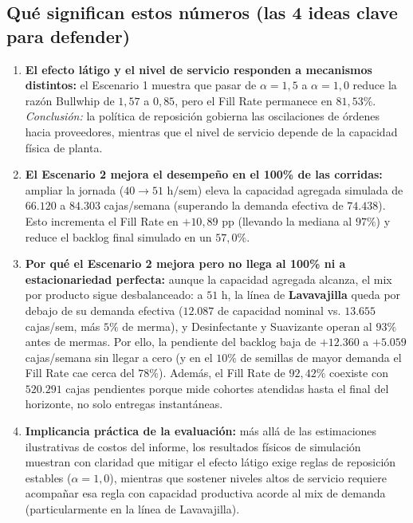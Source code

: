 \documentclass[11pt, a4paper]{article}
\begin{document}
\subsection{Qué significan estos números (las 4 ideas clave para defender)}
\begin{enumerate}[leftmargin=0.5cm, itemsep=3pt]
    \item \textbf{El efecto látigo y el nivel de servicio responden a mecanismos distintos:}
    el Escenario 1 muestra que pasar de $\alpha = 1,5$ a $\alpha = 1,0$ reduce la razón Bullwhip de $1,57$ a $0,85$, pero el Fill Rate permanece en $81,53\%$. \textit{Conclusión:} la política de reposición gobierna las oscilaciones de órdenes hacia proveedores, mientras que el nivel de servicio depende de la capacidad física de planta.

    \item \textbf{El Escenario 2 mejora el desempeño en el 100\% de las corridas:}
    ampliar la jornada ($40 \to 51\text{ h/sem}$) eleva la capacidad agregada simulada de $66.120$ a $84.303$ cajas/semana (superando la demanda efectiva de $74.438$). Esto incrementa el Fill Rate en $+10,89\text{ pp}$ (llevando la mediana al $97\%$) y reduce el backlog final simulado en un $57,0\%$.

    \item \textbf{Por qué el Escenario 2 mejora pero no llega al 100\% ni a estacionariedad perfecta:}
    aunque la capacidad agregada alcanza, el mix por producto sigue desbalanceado: a $51$ h, la línea de \textbf{Lavavajilla} queda por debajo de su demanda efectiva ($12.087$ de capacidad nominal vs. $13.655$ cajas/sem, más $5\%$ de merma), y Desinfectante y Suavizante operan al $93\%$ antes de mermas. Por ello, la pendiente del backlog baja de $+12.360$ a $+5.059$ cajas/semana sin llegar a cero (y en el $10\%$ de semillas de mayor demanda el Fill Rate cae cerca del $78\%$). Además, el Fill Rate de $92,42\%$ coexiste con $520.291$ cajas pendientes porque mide cohortes atendidas hasta el final del horizonte, no solo entregas instantáneas.

    \item \textbf{Implicancia práctica de la evaluación:}
    más allá de las estimaciones ilustrativas de costos del informe, los resultados físicos de simulación muestran con claridad que mitigar el efecto látigo exige reglas de reposición estables ($\alpha = 1,0$), mientras que sostener niveles altos de servicio requiere acompañar esa regla con capacidad productiva acorde al mix de demanda (particularmente en la línea de Lavavajilla).
\end{enumerate}
\end{document}
